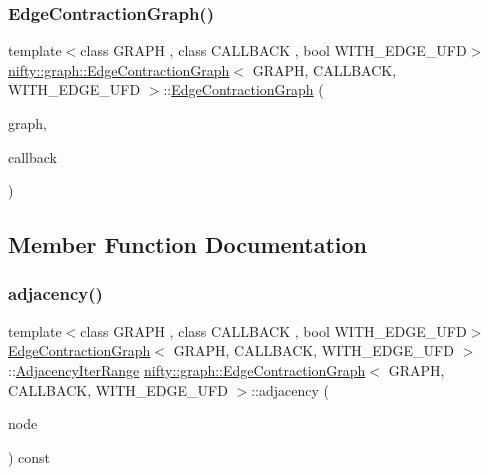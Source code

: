 \subsubsection{\texorpdfstring{Edge\+Contraction\+Graph()}{EdgeContractionGraph()}}
{\footnotesize\ttfamily template$<$class G\+R\+A\+PH , class C\+A\+L\+L\+B\+A\+CK , bool W\+I\+T\+H\+\_\+\+E\+D\+G\+E\+\_\+\+U\+FD$>$ \\
\hyperlink{classnifty_1_1graph_1_1EdgeContractionGraph}{nifty\+::graph\+::\+Edge\+Contraction\+Graph}$<$ G\+R\+A\+PH, C\+A\+L\+L\+B\+A\+CK, W\+I\+T\+H\+\_\+\+E\+D\+G\+E\+\_\+\+U\+FD $>$\+::\hyperlink{classnifty_1_1graph_1_1EdgeContractionGraph}{Edge\+Contraction\+Graph} (\begin{DoxyParamCaption}\item[{const \hyperlink{classnifty_1_1graph_1_1EdgeContractionGraph_a67f653761dbc2c203891b041aacc3f04}{Graph\+Type} \&}]{graph,  }\item[{\hyperlink{classnifty_1_1graph_1_1EdgeContractionGraph_a75e91e51c78d2f427a31c30dcd8996ed}{Callback} \&}]{callback }\end{DoxyParamCaption})\hspace{0.3cm}{\ttfamily [inline]}}



\subsection{Member Function Documentation}
\mbox{\label{classnifty_1_1graph_1_1EdgeContractionGraph_a304b4afa030620170b93269c0f9211ca}} 
\subsubsection{\texorpdfstring{adjacency()}{adjacency()}}
{\footnotesize\ttfamily template$<$class G\+R\+A\+PH , class C\+A\+L\+L\+B\+A\+CK , bool W\+I\+T\+H\+\_\+\+E\+D\+G\+E\+\_\+\+U\+FD$>$ \\
\hyperlink{classnifty_1_1graph_1_1EdgeContractionGraph}{Edge\+Contraction\+Graph}$<$ G\+R\+A\+PH, C\+A\+L\+L\+B\+A\+CK, W\+I\+T\+H\+\_\+\+E\+D\+G\+E\+\_\+\+U\+FD $>$\+::\hyperlink{structnifty_1_1graph_1_1EdgeContractionGraph_1_1AdjacencyIterRange}{Adjacency\+Iter\+Range} \hyperlink{classnifty_1_1graph_1_1EdgeContractionGraph}{nifty\+::graph\+::\+Edge\+Contraction\+Graph}$<$ G\+R\+A\+PH, C\+A\+L\+L\+B\+A\+CK, W\+I\+T\+H\+\_\+\+E\+D\+G\+E\+\_\+\+U\+FD $>$\+::adjacency (\begin{DoxyParamCaption}\item[{const int64\+\_\+t}]{node }\end{DoxyParamCaption}) const\hspace{0.3cm}{\ttfamily [inline]}}

